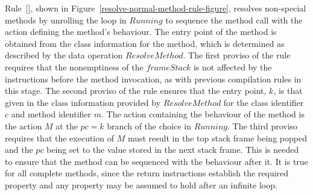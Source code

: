 Rule~[], shown in
Figure~\ref{resolve-normal-method-rule-figure}, resolves non-special
methods by unrolling the loop in $Running$ to sequence the method call
with the action defining the method's behaviour.
The entry point of the method is obtained from the class information
for the method, which is determined as described by the data operation
$ResolveMethod$.
The first proviso of the rule requires that the nonemptiness of the
$frameStack$ is not affected by the instructions before the method
invocation, as with previous compilation rules in this stage. 
The second proviso of the rule ensures that the entry point, $k$, is
that given in the class information provided by $ResolveMethod$ for
the class identifier $c$ and method identifier $m$.
The action containing the behaviour of the method is the action $M$ at
the $pc = k$ branch of the choice in $Running$.
The third proviso requires that the execution of $M$ must result in
the top stack frame being popped and the $pc$ being set to the value
stored in the next stack frame.
This is needed to ensure that the method can be sequenced with the
behaviour after it.
It is true for all complete methods, since the return instructions
establish the required property and any property may be assumed to
hold after an infinite loop.
